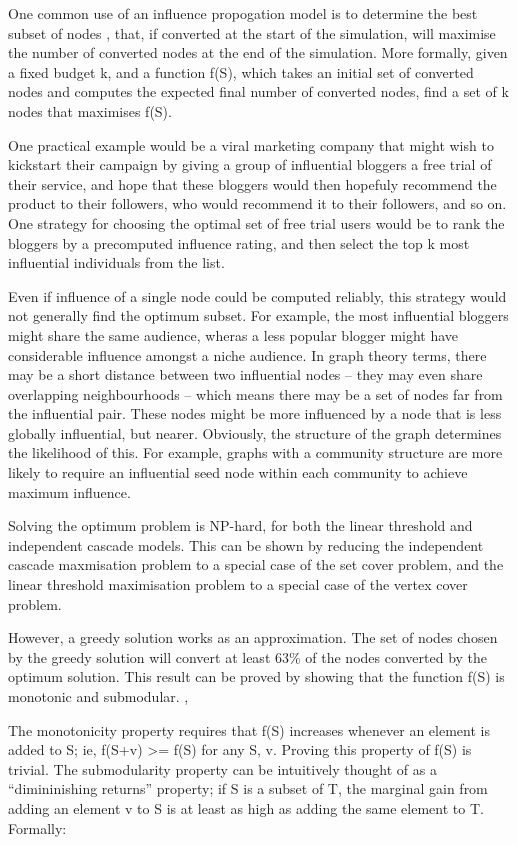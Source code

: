 One common use of an influence propogation model is to determine the best subset of nodes \cite{kempe}, that, if converted at the start of the simulation, will maximise the number of converted nodes at the end of the simulation. More formally, given a fixed budget k, and a function f(S), which takes an initial set of converted nodes and computes the expected final number of converted nodes, find a set of k nodes that maximises f(S).

One practical example would be a viral marketing company that might wish to kickstart their campaign by giving a group of influential bloggers a free trial of their service, and hope that these bloggers would then hopefuly recommend the product to their followers, who would recommend it to their followers, and so on. One strategy for choosing the optimal set of free trial users would be to rank the bloggers by a precomputed influence rating, and then select the top k most influential individuals from the list.

Even if influence of a single node could be computed reliably, this strategy would not generally find the optimum subset. For example, the most influential bloggers might share the same audience, wheras a less popular blogger might have considerable influence amongst a niche audience. In graph theory terms, there may be a short distance between two influential nodes -- they may even share overlapping neighbourhoods -- which means there may be a set of nodes far from the influential pair. These nodes might be more influenced by a node that is less globally influential, but nearer. Obviously, the structure of the graph determines the likelihood of this. For example, graphs with a community structure are more likely to require an influential seed node within each community to achieve maximum influence.

Solving the optimum problem is NP-hard, for both the linear threshold and independent cascade models. This can be shown by reducing the independent cascade maxmisation problem to a special case of the set cover problem, and the linear threshold maximisation problem to a special case of the vertex cover problem.

However, a greedy solution works as an approximation. The set of nodes chosen by the greedy solution will convert at least 63\% of the nodes converted by the optimum solution. This result can be proved by showing that the function f(S) is monotonic and submodular. \cite{mossel}, \cite{kempe}

The monotonicity property requires that f(S) increases whenever an element is added to S; ie, f(S+v) >= f(S) for any S, v. Proving this property of f(S) is trivial. The submodularity property can be intuitively thought of as a ``dimininishing returns'' property; if S is a subset of T, the marginal gain from adding an element v to S is at least as high as adding the same element to T. Formally:


